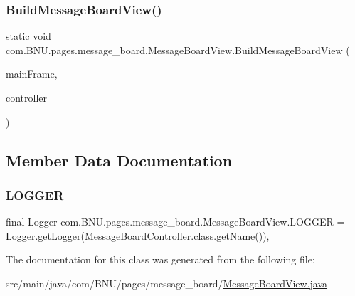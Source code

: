 \subsubsection{\texorpdfstring{Build\+Message\+Board\+View()}{BuildMessageBoardView()}}
{\footnotesize\ttfamily static void com.\+B\+N\+U.\+pages.\+message\+\_\+board.\+Message\+Board\+View.\+Build\+Message\+Board\+View (\begin{DoxyParamCaption}\item[{J\+Frame}]{main\+Frame,  }\item[{\mbox{\hyperlink{classcom_1_1_b_n_u_1_1pages_1_1message__board_1_1_message_board_controller}{Message\+Board\+Controller}}}]{controller }\end{DoxyParamCaption})\hspace{0.3cm}{\ttfamily [static]}}



\subsection{Member Data Documentation}
\mbox{\label{classcom_1_1_b_n_u_1_1pages_1_1message__board_1_1_message_board_view_a8cb5ec8649c5ae123b5e9fffb85152e5}} 
\subsubsection{\texorpdfstring{L\+O\+G\+G\+ER}{LOGGER}}
{\footnotesize\ttfamily final Logger com.\+B\+N\+U.\+pages.\+message\+\_\+board.\+Message\+Board\+View.\+L\+O\+G\+G\+ER = Logger.\+get\+Logger(Message\+Board\+Controller.\+class.\+get\+Name())\hspace{0.3cm}{\ttfamily [static]}, {\ttfamily [private]}}



The documentation for this class was generated from the following file\+:\begin{DoxyCompactItemize}
\item 
src/main/java/com/\+B\+N\+U/pages/message\+\_\+board/\mbox{\hyperlink{_message_board_view_8java}{Message\+Board\+View.\+java}}\end{DoxyCompactItemize}
